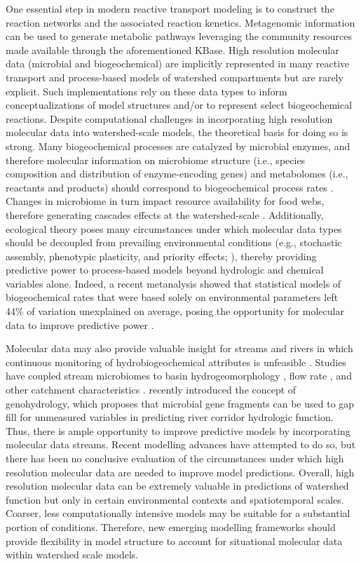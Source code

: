 \documentclass[preprint,review, 12pt]{elsarticle}
\begin{document}
One essential step in modern reactive transport modeling is to construct the reaction networks and the associated reaction kenetics. Metagenomic information can be used to generate metabolic pathways leveraging the community resources made available through the aforementioned KBase. High resolution molecular data (microbial and biogeochemical) are implicitly represented in many reactive transport and process-based models of watershed compartments but are rarely explicit. Such implementations rely on these data types to inform conceptualizations of model structures and/or to represent select biogeochemical reactions. Despite computational challenges in incorporating high resolution molecular data into watershed-scale models, the theoretical basis for doing so is strong. Many biogeochemical processes are catalyzed by microbial enzymes, and therefore molecular information on microbiome structure (i.e., species composition and distribution of enzyme-encoding genes) and metabolomes (i.e., reactants and products) should correspond to biogeochemical process rates \citep{Rocca2015}. Changes in microbiome in turn impact resource availability for food webs, therefore generating cascades effects at the watershed-scale \citep{Graham2019}. Additionally, ecological theory poses many circumstances under which molecular data types should be decoupled from prevailing environmental conditions (e.g., stochastic assembly, phenotypic plasticity, and priority effects; \citealp{DeWitt1998, Hubbell2001, Fukami2010, Stegen2012, Nemergut2013, Graham2016}), thereby providing predictive power to process-based models beyond hydrologic and chemical variables alone. Indeed, a recent metanalysis showed that statistical models of biogeochemical rates that were based solely on environmental parameters left 44\% of variation unexplained on average, posing the opportunity for molecular data to improve predictive power \citep{Graham2016}. 

Molecular data may also provide valuable insight for streams and rivers in which continuous monitoring of hydrobiogeochemical attributes is unfeasible \citep{Seibert2013, Good2018}. Studies have coupled stream microbiomes to basin hydrogeomorphology \citep{Read2015}, flow rate \citep{Crump2005, Doherty2017}, and other catchment characteristics \citep{Savio2015}. \citet{Good2018} recently introduced the concept of genohydrology, which proposes that microbial gene fragments can be used to gap fill for unmeasured variables in predicting river corridor hydrologic function. Thus, there is ample opportunity to improve predictive models by incorporating molecular data streams. Recent modelling advances have attempted to do so, but there has been no conclusive evaluation of the circumstances under which high resolution molecular data are needed to improve model predictions. Overall, high resolution molecular data can be extremely valuable in predictions of watershed function but only in certain environmental contexts and spatiotemporal scales. Coarser, less computationally intensive models may be suitable for a substantial portion of conditions. Therefore, new emerging modelling frameworks should provide flexibility in model structure to account for situational molecular data within watershed scale models.
\end{document}
